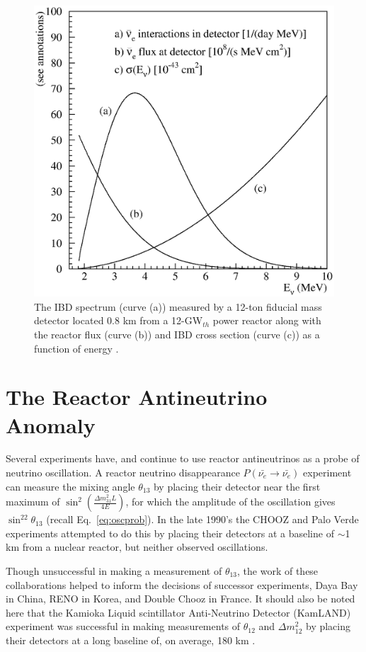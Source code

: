 \begin{figure}[!t]
	\centering
	\includegraphics[width=0.55\linewidth]{tex/3-reactorneutrinos-images/vogel-fig02}
	\caption[The IBD spectrum.]{The IBD spectrum (curve (a)) measured by a 12-ton fiducial mass detector located 0.8 km from a 12-GW$_{th}$ power reactor along with the reactor flux (curve (b)) and IBD cross section (curve (c)) as a function of energy \cite{PDG}.}
	\label{fig:vogel-fig02}
\end{figure}


\section{The Reactor Antineutrino Anomaly}

Several experiments have, and continue to use reactor antineutrinos as a probe of neutrino oscillation. 
A reactor neutrino disappearance $P(\bar{\nu_{e}} \rightarrow \bar{\nu_{e}})$ experiment can measure the mixing angle $\theta_{13}$ by placing their detector near the first maximum of $\sin^2\left(\frac{\Delta m^2_{31}L}{4E}\right)$, for which the amplitude of the oscillation gives $\sin^22\theta_{13}$ (recall Eq.~\ref{eq:oscprob}).
In the late 1990's the CHOOZ \cite{Apollonio:1999ae,Apollonio:2002gd} and Palo Verde \cite{Boehm:2001ik} experiments attempted to do this by placing their detectors at a baseline of $\sim$1 km from a nuclear reactor, but neither observed oscillations.

Though unsuccessful in making a measurement of $\theta_{13}$, the work of these collaborations helped to inform the decisions of successor experiments, Daya Bay in China, RENO in Korea, and Double Chooz in France. 
It should also be noted here that the Kamioka Liquid scintillator Anti-Neutrino Detector (KamLAND) experiment was successful in making measurements of $\theta_{12}$ and $\Delta m^2_{12}$  by placing their detectors at a long baseline of, on average, 180 km \cite{Eguchi:2002dm, Araki:2004mb}.

